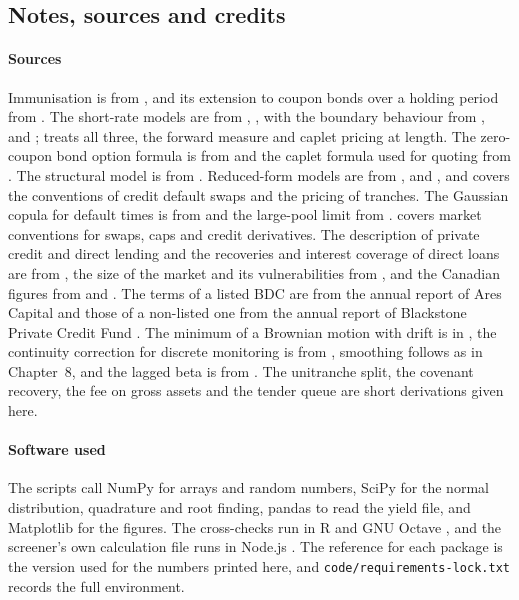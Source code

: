 \begin{chapterrefs}
\section{Notes, sources and credits}
\label{sec6:credits}

\paragraph{Sources}
Immunisation is from \textcite{redington1952}, and its extension to coupon bonds over a holding period
from \textcite{fisher1971}. The short-rate models are from \textcite{vasicek1977}, \textcite{cox1985},
with the boundary behaviour from \textcite{feller1951}, and \textcite{ho1986}; \textcite{brigo2006}
treats all three, the forward measure and caplet pricing at length. The zero-coupon bond option
formula is from \textcite{jamshidian1989} and the caplet formula used for quoting from
\textcite{black1976}. The structural model is from \textcite{merton1974}. Reduced-form models are from
\textcite{jarrow1995}, \textcite{lando1998} and \textcite{duffie1999}, and \textcite{okane2008}
covers the conventions of credit default swaps and the pricing of tranches. The Gaussian copula for
default times is from \textcite{li2000} and the large-pool limit from \textcite{vasicek2002}.
\textcite{hull2022} covers market conventions for swaps, caps and credit derivatives. The description of
private credit and direct lending and the recoveries and interest coverage of direct loans are from
\textcite{cai2024}, the size of the market and its vulnerabilities from \textcite{imf2024gfsr}, and the
Canadian figures from \textcite{boc2026private} and \textcite{bocfsr2026}. The terms of a listed BDC are
from the annual report of Ares Capital \parencite{arcc2025} and those of a non-listed one from the annual
report of Blackstone Private Credit Fund \parencite{bcred2025}. The minimum of a Brownian motion with drift
is in \textcite{shreve2004}, the continuity correction for discrete monitoring is from
\textcite{broadie1997}, smoothing follows \textcite{geltner1993} as in Chapter~8, and the lagged beta is
from \textcite{dimson1979}. The unitranche split, the covenant recovery, the fee on gross assets and the
tender queue are short derivations given here.

\paragraph{Software used}
The scripts call NumPy \parencite{numpy} for arrays and random numbers, SciPy \parencite{scipy} for the normal
distribution, quadrature and root finding, pandas \parencite{pandas} to read the yield file, and
Matplotlib \parencite{matplotlib} for the figures. The cross-checks run in R \parencite{rcore} and
GNU Octave \parencite{octave}, and the screener's own calculation file runs in Node.js \parencite{nodejs}. The reference for
each package is the version used for the numbers printed here, and
\texttt{code/requirements-lock.txt} records the full environment.


\end{chapterrefs}
